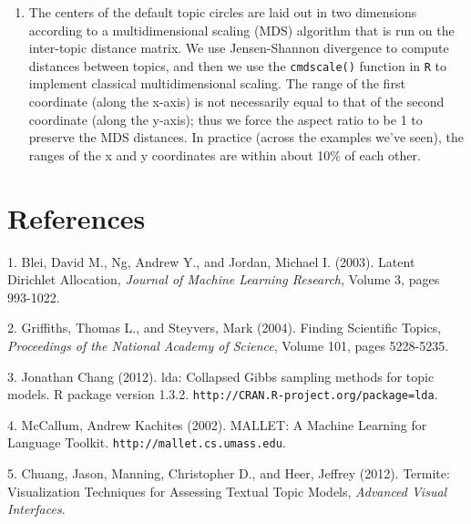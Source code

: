 \documentclass[12pt]{article}
\begin{document}
\begin{enumerate}
\item The centers of the default topic circles are laid out in two dimensions according to a multidimensional scaling (MDS) algorithm that is run on the inter-topic distance matrix. We use Jensen-Shannon divergence to compute distances between topics, and then we use the \texttt{cmdscale()} function in \texttt{R} to implement classical multidimensional scaling. The range of the first coordinate (along the x-axis) is not necessarily equal to that of the second coordinate (along the y-axis); thus we force the aspect ratio to be 1 to preserve the MDS distances. In practice (across the examples we've seen), the ranges of the x and y coordinates are within about 10\% of each other.
\end{enumerate}





\section{References}

1. Blei, David M., Ng, Andrew Y., and Jordan, Michael I. (2003). Latent Dirichlet Allocation, \emph{Journal of Machine Learning Research}, Volume 3, pages 993-1022.

2. Griffiths, Thomas L., and Steyvers, Mark (2004). Finding Scientific Topics, \emph{Proceedings of the National Academy of Science}, Volume 101, pages 5228-5235.

3. Jonathan Chang (2012). lda: Collapsed Gibbs sampling methods for topic models. R package version 1.3.2. \texttt{http://CRAN.R-project.org/package=lda}.

4. McCallum, Andrew Kachites (2002). MALLET: A Machine Learning for Language Toolkit. \texttt{http://mallet.cs.umass.edu}.

5. Chuang, Jason, Manning, Christopher D., and Heer, Jeffrey (2012). Termite: Visualization Techniques for Assessing Textual Topic Models, \emph{Advanced Visual Interfaces}.
\end{document}
